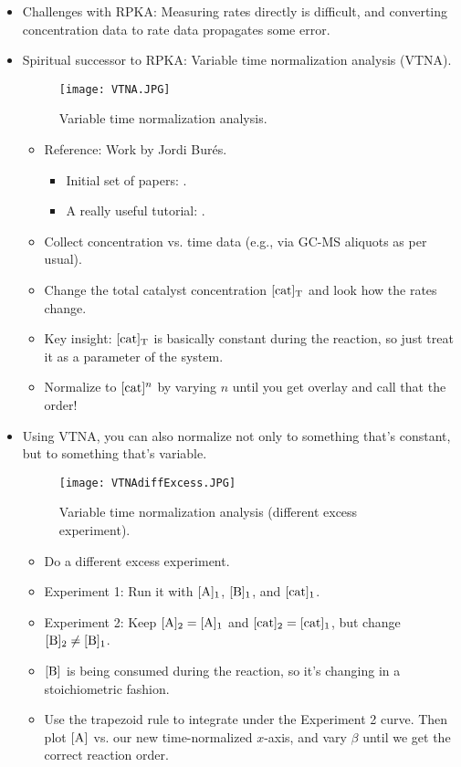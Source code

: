 \documentclass[../notes.tex]{subfiles}
\begin{document}
\begin{itemize}
\begin{itemize}
    \end{itemize}
    \item Challenges with RPKA: Measuring rates directly is difficult, and converting concentration data to rate data propagates some error.
    \item Spiritual successor to RPKA: Variable time normalization analysis (VTNA).
    \begin{figure}[h!]
        \centering
        \texttt{[image: VTNA.JPG]}
        \caption{Variable time normalization analysis.}
        \label{fig:VTNA}
    \end{figure}
    \begin{itemize}
        \item Reference: Work by Jordi Bur\'{e}s.
        \begin{itemize}
            \item Initial set of papers: \textcite{bib:VTNA1}.
            \item A really useful tutorial: \textcite{bib:VTNA2}.
        \end{itemize}
        \item Collect concentration vs. time data (e.g., via GC-MS aliquots as per usual).
        \item Change the total catalyst concentration $\cnc[T]{cat}$ and look how the rates change.
        \item Key insight: $\cnc[T]{cat}$ is basically constant during the reaction, so just treat it as a parameter of the system.
        \item Normalize to $\cnc{cat}^n$ by varying $n$ until you get overlay and call that the order!
    \end{itemize}
    \pagebreak
    \item Using VTNA, you can also normalize not only to something that's constant, but to something that's variable.
    \begin{figure}[h!]
        \centering
        \texttt{[image: VTNAdiffExcess.JPG]}
        \caption{Variable time normalization analysis (different excess experiment).}
        \label{fig:VTNAdiffExcess}
    \end{figure}
    \begin{itemize}
        \item Do a different excess experiment.
        \item Experiment 1: Run it with $\cnc[1]{A}$, $\cnc[1]{B}$, and $\cnc[1]{cat}$.
        \item Experiment 2: Keep $\cnc[2]{A}=\cnc[1]{A}$ and $\cnc[2]{cat}=\cnc[1]{cat}$, but change $\cnc[2]{B}\neq\cnc[1]{B}$.
        \item $\cnc{B}$ is being consumed during the reaction, so it's changing in a stoichiometric fashion.
        \item Use the trapezoid rule to integrate under the Experiment 2 curve. Then plot $\cnc{A}$ vs. our new time-normalized $x$-axis, and vary $\beta$ until we get the correct reaction order.
    \end{itemize}
\end{itemize}
\end{document}
